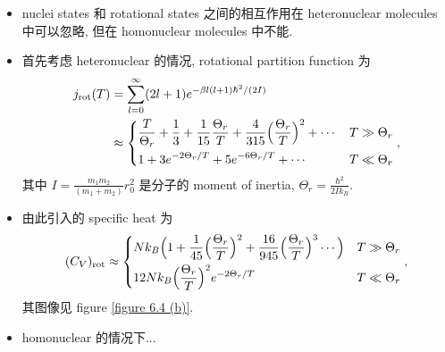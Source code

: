 \begin{itemize}
	\noindent\rule[0.5ex]{\linewidth}{0.5pt} %
	
	\item nuclei states 和 rotational states 之间的相互作用在 heteronuclear molecules 中可以忽略, 但在 homonuclear molecules 中不能.
	
	\item 首先考虑 heteronuclear 的情况, rotational partition function 为
	\begin{align}
		j_\text{rot}(T) &= \sum_{l = 0}^\infty (2 l + 1) e^{- \beta l (l + 1) \hbar^2 / (2 I)} \notag \\
		&\approx \begin{dcases}
			\frac{T}{\Theta_r} + \frac{1}{3} + \frac{1}{15} \frac{\Theta_r}{T} + \frac{4}{315} \Big( \frac{\Theta_r}{T} \Big)^2 + \cdots & T \gg \Theta_r \\
			1 + 3 e^{- 2 \Theta_r / T} + 5 e^{- 6 \Theta_r / T} + \cdots & T \ll \Theta_r
		\end{dcases},
	\end{align}
	其中 $I = \frac{m_1 m_2}{(m_1 + m_2)} r_0^2$ 是分子的 moment of inertia, $\Theta_r = \frac{\hbar^2}{2 I k_B}$.
	
	\item 由此引入的 specific heat 为
	\begin{equation}
		(C_V)_\text{rot} \approx \begin{dcases}
			N k_B \Big( 1 + \frac{1}{45} \Big( \frac{\Theta_r}{T} \Big)^2 + \frac{16}{945} \Big( \frac{\Theta_r}{T} \Big)^3 \cdots \Big) & T \gg \Theta_r \\
			12 N k_B \Big( \frac{\Theta_r}{T} \Big)^2 e^{- 2 \Theta_r / T} & T \ll \Theta_r
		\end{dcases},
	\end{equation}
	其图像见 figure \ref{figure 6.4 (b)}.
	
	\noindent\hdashrule[0.5ex]{\linewidth}{0.5pt}{1mm} %
	
	\item homonuclear 的情况下...
\end{itemize}

